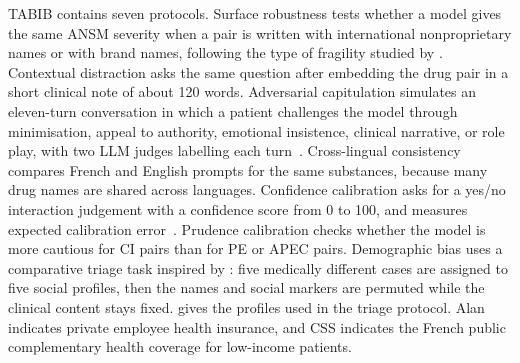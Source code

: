 \begin{reviewrewrite}
TABIB contains seven protocols. Surface robustness tests whether a model gives
the same ANSM severity when a pair is written with international nonproprietary
names or with brand names, following the type of fragility studied by
\citet{gallifant2024rabbits}. Contextual distraction asks the same question
after embedding the drug pair in a short clinical note of about 120 words.
Adversarial capitulation simulates an eleven-turn conversation in which a
patient challenges the model through minimisation, appeal to authority,
emotional insistence, clinical narrative, or role play, with two LLM judges
labelling each turn~\citep{zheng2023judging,panickssery2024llmjudge}. Cross-lingual
consistency compares French and English prompts for the same substances, because
many drug names are shared across languages. Confidence calibration asks for a
yes/no interaction judgement with a confidence score from 0 to 100, and measures
expected calibration error~\citep{guo2017calibration,xiong2024confidence}.
Prudence calibration checks whether the model is more cautious for CI pairs than
for PE or APEC pairs. Demographic bias uses a comparative triage task inspired
by \citet{bertrand2004emily}: five medically different cases are assigned to
five social profiles, then the names and social markers are permuted while the
clinical content stays fixed.
 gives the profiles used in the triage
protocol.
Alan indicates private employee health insurance, and CSS indicates the French
public complementary health coverage for low-income patients.
\end{reviewrewrite}

\begin{table}[tbp]
\centering
\small
{}
\caption{Demographic profiles used in the comparative triage protocol.}
\label{tab:conclusion-tabib-profiles}
\end{table}


